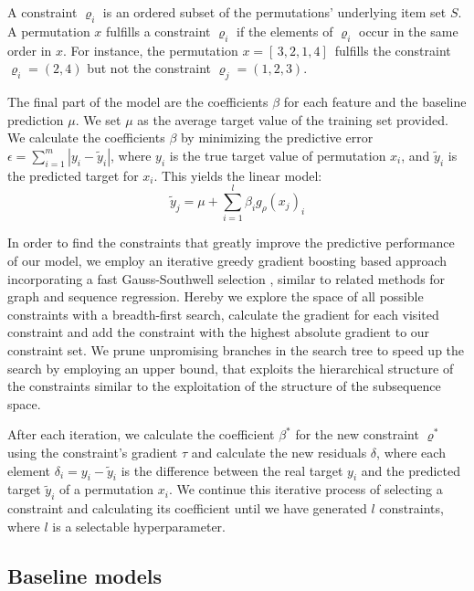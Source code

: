 A constraint $\varrho_i$ is an ordered subset of the permutations' underlying item set $S$. A permutation $x$ fulfills a constraint $\varrho_i$ if the elements of $\varrho_i$ occur in the same order in $x$. For instance, the permutation $x=[ \, 3, 2, 1, 4] \,$ fulfills the constraint $\varrho_i=(2,4)$ but not the constraint $\varrho_j=(1,2,3)$.

The final part of the model are the coefficients $\beta$ for each feature and the baseline prediction $\mu$. We set $\mu$ as the average target value of the training set provided. We calculate the coefficients $\beta$ by minimizing the predictive error $\epsilon = \sum_{i=1}^m |y_i - \tilde{y}_i|$, where $y_i$ is the true target value of permutation $x_i$, and $\tilde{y}_i$ is the predicted target for $x_i$. This yields the linear model:
\begin{equation*}
    \tilde{y}_j = \mu + \sum_{i=1}^{l}\beta_i g_{\rho}(x_j)_i
\end{equation*}

In order to find the constraints that greatly improve the predictive performance of our model, we employ an iterative greedy gradient boosting \cite{gradboost} based approach incorporating a fast Gauss-Southwell selection \cite{gauss_southwell,seq_reg}, similar to related methods for graph \cite{graph_reg} and sequence \cite{seq_reg} regression. Hereby we explore the space of all possible constraints with a breadth-first search, calculate the gradient for each visited constraint and add the constraint with the highest absolute gradient to our constraint set. We prune unpromising branches in the search tree to speed up the search by employing an upper bound, that exploits the hierarchical structure of the constraints similar to the exploitation of the structure of the subsequence space\cite{seq_reg}.


After each iteration, we calculate the coefficient $\beta^*$ for the new constraint $\varrho^*$ using the constraint's gradient $\tau$ and calculate the new residuals $\delta$, where each element $\delta_i = y_i - \tilde{y}_i$ is the difference between the real target $y_i$ and the predicted target $\tilde{y}_i$ of a permutation $x_i$. We continue this iterative process of selecting a constraint and calculating its coefficient until we have generated $l$ constraints, where $l$ is a selectable hyperparameter.





\subsection{Baseline models}

